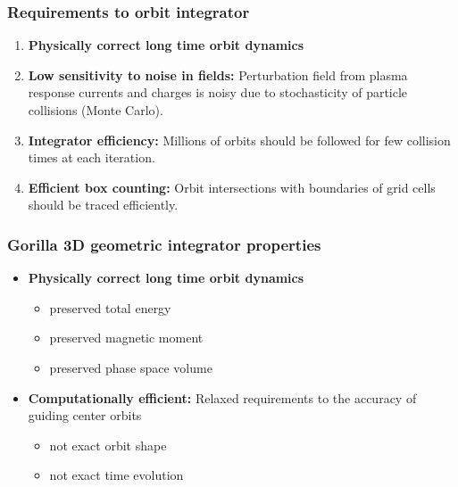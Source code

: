 \documentclass{beamer}
\begin{document}
\begin{frame}
\frametitle{Requirements to orbit integrator}
\vspace{-0.5cm}
\begin{enumerate}
\item \textbf{Physically correct long time orbit dynamics}
\item \textbf{Low sensitivity to noise in fields:} Perturbation field from plasma response currents and charges is noisy due to stochasticity of particle collisions (Monte Carlo).
\item \textbf{Integrator efficiency:} Millions of orbits should be followed for few collision times at each iteration.
\item \textbf{Efficient box counting:} Orbit intersections with boundaries of grid cells should be traced efficiently.

\end{enumerate}
\end{frame}


\begin{frame}
\frametitle{\textbf{Gorilla} 3D geometric integrator properties}
\vspace{-0.5cm}
\begin{itemize}
	\item \textbf{Physically correct long time orbit dynamics}
	\begin{itemize}
		\item preserved total energy
		\item preserved magnetic moment
		\item preserved phase space volume 
	\end{itemize}
	\item \textbf{Computationally efficient:} Relaxed requirements to the accuracy of guiding center orbits
		\begin{itemize}
			\item not exact orbit shape
			\item not exact time evolution
		\end{itemize}
\end{itemize}
\end{frame}
\end{document}
